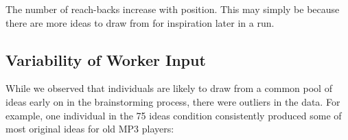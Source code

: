 The number of reach-backs increase with position. This may simply be because there are more ideas to draw from for inspiration later in a run.





\subsection{Variability of Worker Input}
While we observed that individuals are likely to draw from a common pool of ideas early on in the brainstorming process, there were outliers in the data. For example, one individual in the 75 ideas condition consistently produced some of most original ideas for old MP3 players:

